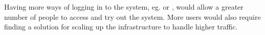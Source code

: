 Having more ways of logging in to the system, eg. \github{} or \facebook{}, would allow a greater number of people to access and try out the system. More users would also require finding a solution for scaling up the infrastructure to handle higher traffic.
